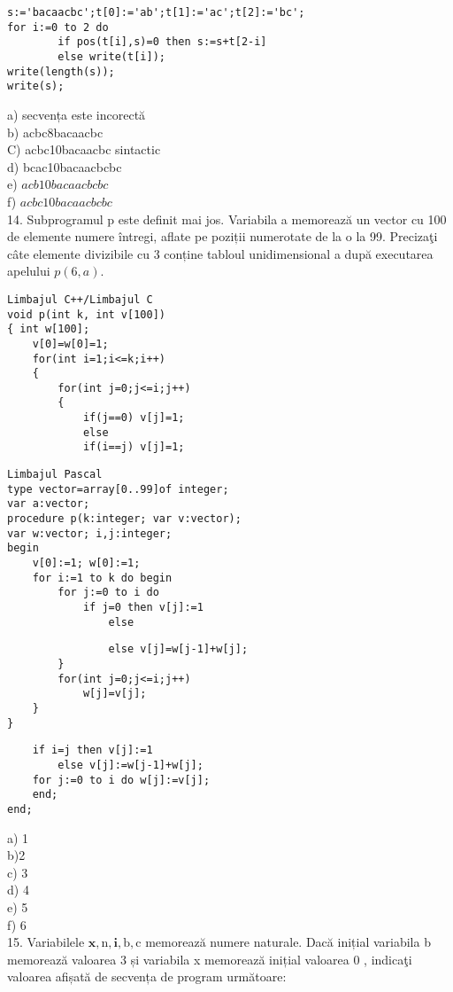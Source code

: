 \begin{verbatim}
s:='bacaacbc';t[0]:='ab';t[1]:='ac';t[2]:='bc';
for i:=0 to 2 do
        if pos(t[i],s)=0 then s:=s+t[2-i]
        else write(t[i]);
write(length(s));
write(s);
\end{verbatim}

a) secvența este incorectă\\
b) acbc8bacaacbc\\
C) acbc10bacaacbc sintactic\\
d) bcac10bacaacbcbc\\
e) $a c b 10 b a c a a c b c b c$\\
f) $a c b c 10 b a c a a c b c b c$\\
14. Subprogramul p este definit mai jos. Variabila a memorează un vector cu 100 de elemente numere întregi, aflate pe poziții numerotate de la o la 99. Precizaţi câte elemente divizibile cu 3 conține tabloul unidimensional a după executarea apelului $p(6, a)$.

\begin{verbatim}
Limbajul C++/Limbajul C
void p(int k, int v[100])
{ int w[100];
    v[0]=w[0]=1;
    for(int i=1;i<=k;i++)
    {
        for(int j=0;j<=i;j++)
        {
            if(j==0) v[j]=1;
            else
            if(i==j) v[j]=1;
\end{verbatim}

\begin{verbatim}
Limbajul Pascal
type vector=array[0..99]of integer;
var a:vector;
procedure p(k:integer; var v:vector);
var w:vector; i,j:integer;
begin
    v[0]:=1; w[0]:=1;
    for i:=1 to k do begin
        for j:=0 to i do
            if j=0 then v[j]:=1
                else
\end{verbatim}

\begin{verbatim}
                else v[j]=w[j-1]+w[j];
        }
        for(int j=0;j<=i;j++)
            w[j]=v[j];
    }
}
\end{verbatim}

\begin{verbatim}
    if i=j then v[j]:=1
        else v[j]:=w[j-1]+w[j];
    for j:=0 to i do w[j]:=v[j];
    end;
end;
\end{verbatim}

a) 1\\
b)2\\
c) 3\\
d) 4\\
e) 5\\
f) 6\\
15. Variabilele $\mathbf{x}, \mathrm{n}, \mathbf{i}, \mathrm{b}, \mathrm{c}$ memorează numere naturale. Dacă inițial variabila b memorează valoarea 3 și variabila x memorează inițial valoarea 0 , indicaţi valoarea afișată de secvența de program următoare:


